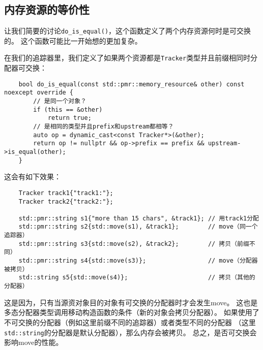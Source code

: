 \subsection{内存资源的等价性}
让我们简要的讨论\texttt{do\_is\_equal()}，这个函数定义了两个内存资源何时是可交换的。
这个函数可能比一开始想的更加复杂。

在我们的追踪器里，我们定义了如果两个资源都是\texttt{Tracker}类型并且前缀相同时分配器可交换：
\begin{lstlisting}
    bool do_is_equal(const std::pmr::memory_resource& other) const noexcept override {
        // 是同一个对象？
        if (this == &other)
            return true;
        // 是相同的类型并且prefix和upstream都相等？
        auto op = dynamic_cast<const Tracker*>(&other);
        return op != nullptr && op->prefix == prefix && upstream->is_equal(other);
    }
\end{lstlisting}
这会有如下效果：
\begin{lstlisting}
    Tracker track1{"track1:"};
    Tracker track2{"track2:"};

    std::pmr::string s1{"more than 15 chars", &track1}; // 用track1分配
    std::pmr::string s2{std::move(s1), &track1};        // move（同一个追踪器）
    std::pmr::string s3{std::move(s2), &track2};        // 拷贝（前缀不同）
    std::pmr::string s4{std::move(s3)};                 // move（分配器被拷贝）
    std::string s5{std::move(s4)};                      // 拷贝（其他的分配器）
\end{lstlisting}
这是因为，只有当源资对象目的对象有可交换的分配器时才会发生move。
这也是多态分配器类型调用移动构造函数的条件（新的对象会拷贝分配器）。
如果使用了不可交换的分配器（例如这里前缀不同的追踪器）或者类型不同的分配器
（这里\texttt{std::string}的分配器是默认分配器），那么内存会被拷贝。
总之，是否可交换会影响move的性能。

